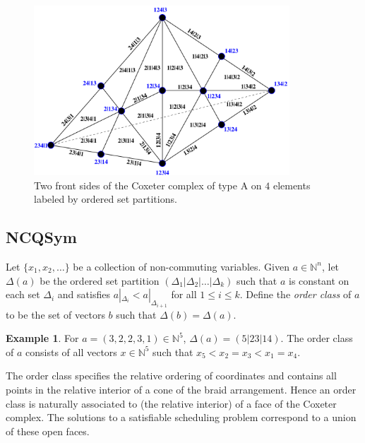 \documentclass[12pt,reqno]{amsart}
\numberwithin{definition}{section}
\theoremstyle{definition}
\newtheorem{example}[definition]{Example}
\begin{document}
\begin{figure}[h]
\includegraphics[height=2.5in]{Cox.pdf}
\caption{Two front sides of the Coxeter complex of type A on $4$ elements labeled by ordered set partitions.}
\end{figure}

\subsection{NCQSym}


Let $\{x_1, x_2, \ldots \}$ be a collection of non-commuting
variables.  Given $a \in \mathbb{N}^n$, let $\Delta(a)$
be the ordered set partition $(\Delta_1 | \Delta_2 | \ldots | \Delta_k)$ such that 
$a$ is constant on each set $\Delta_i$
and satisfies $a|_{\Delta_i} < a|_{\Delta_{i+1}}$ for all $1 \leq i \leq k$. 
Define the \emph{order class} of $a$ to be the set of vectors $b$
such that $\Delta(b) = \Delta(a)$.  

\begin{example}
For $a = (3,2,2,3,1) \in \mathbb{N}^5$, $\Delta(a) =
(5|23|14)$.  The order class of $a$ consists of all vectors $x
\in \mathbb{N}^5$ such that $x_5 < x_2 = x_3 < x_1 = x_4$. 
\end{example}


The order class specifies the relative ordering of coordinates and contains all points in the relative interior of a cone
of the braid arrangement.  Hence an order class is naturally associated to (the relative interior) of a face of
the Coxeter complex.  
The solutions to a satisfiable scheduling problem correspond to a union of these open faces.   
\end{document}
